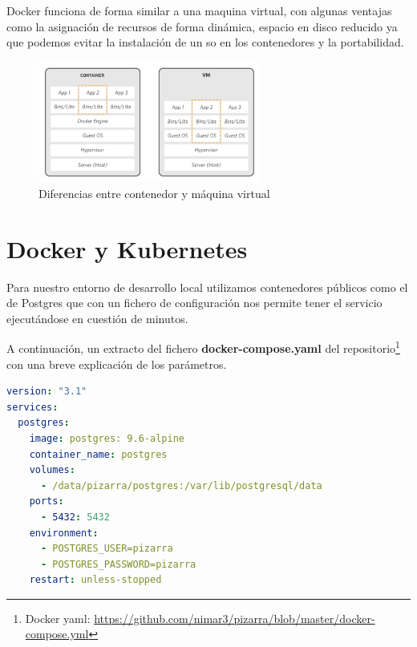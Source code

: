 \documentclass[11pt,spanish,listoffigures,listoftables]{tfgetsinf}
\begin{document}
Docker funciona de forma similar a una maquina virtual, con algunas ventajas como la asignación de recursos de forma dinámica, espacio en disco reducido ya que podemos evitar la instalación de un \acrshort{so} en los contenedores y la portabilidad.


\begin{figure}[ht]
	\centering
	\includegraphics[width=0.65\textwidth]{img/container-vs-vm}
	\caption[Diferencias entre contenedor Docker y máquina virtual]{Diferencias entre contenedor y máquina virtual}
	\label{figura:container-vs-vm}
\end{figure}

\section{Docker y Kubernetes}

Para nuestro entorno de desarrollo local utilizamos contenedores públicos como el de Postgres que con un fichero de configuración nos permite tener el servicio ejecutándose en cuestión de minutos.

A continuación, un extracto del fichero \textbf{docker-compose.yaml} del repositorio\footnote{Docker yaml: \url{https://github.com/nimar3/pizarra/blob/master/docker-compose.yml}} con una breve explicación de los parámetros.

\begin{lstlisting}[language=yaml]
version: "3.1"
services:
  postgres:
    image: postgres: 9.6-alpine
    container_name: postgres
    volumes:
      - /data/pizarra/postgres:/var/lib/postgresql/data
    ports:
      - 5432: 5432
    environment:
      - POSTGRES_USER=pizarra
      - POSTGRES_PASSWORD=pizarra
    restart: unless-stopped
\end{lstlisting}
\end{document}
